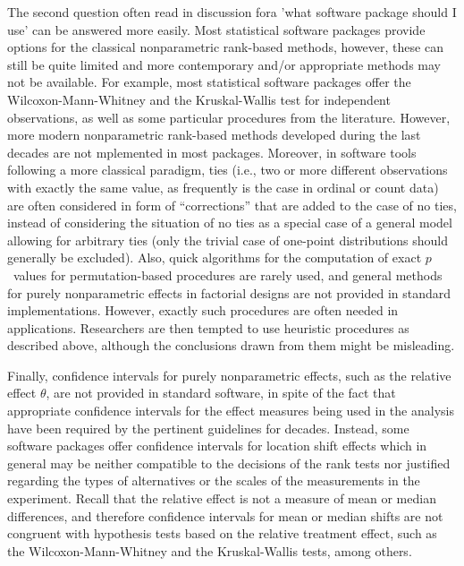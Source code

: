 The second question often read in discussion fora \textemdash 'what software package should I use' \textemdash can be answered more easily. Most statistical software packages provide options for the classical nonparametric rank-based methods, however, these can still be quite limited and more contemporary and/or appropriate methods may not be available. For example, most statistical software packages offer the Wilcoxon-Mann-Whitney and 
the Kruskal-Wallis test for independent observations, as well as some 
particular procedures from the literature. However, more modern nonparametric 
rank-based methods developed during the last decades 
\citep{ruymgaart1980unified,akritas1994fully, akritas1997nonparametric, 
brunner199619, konietschke2012rank, brunner2017rank, brunner2019rank} 
are not mplemented in most packages. Moreover, in software tools following a 
more classical paradigm, ties (i.e., two or more different observations with 
exactly the same value, as frequently is the case in ordinal or count data) are 
often considered in form of ``corrections'' that are added to the case of no 
ties, instead of considering the situation of no ties as a special case of a 
general model allowing for arbitrary ties (only the trivial case of one-point
distributions should generally be excluded). Also, quick algorithms 
\citep{streitberg1986exact,mehta1988importance} for the computation of exact 
$p$~values for permutation-based procedures are rarely used, and general 
methods for purely nonparametric effects in factorial designs are not provided 
in standard implementations. However, exactly such procedures are often needed 
in applications. Researchers are then tempted to use heuristic procedures as 
described above, although the conclusions drawn from them might be misleading. 

Finally, confidence intervals for purely nonparametric effects, such as the 
relative effect $\theta$, are not provided in standard software, in spite of 
the fact that appropriate confidence intervals for the effect measures being 
used in the analysis have been required by the pertinent guidelines for decades. 
Instead, some software packages offer confidence intervals for 
location shift effects which in general may be neither compatible to the 
decisions of the rank tests nor justified regarding the types of alternatives 
or the scales of the measurements in the experiment. Recall that the relative 
effect is not a measure of mean or median differences, and therefore confidence 
intervals for mean or median shifts are not congruent with hypothesis tests 
based on the relative treatment effect, such as the Wilcoxon-Mann-Whitney and 
the Kruskal-Wallis tests, among others.

